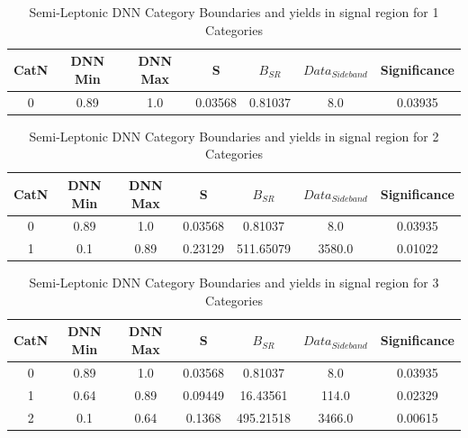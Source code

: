 \newpage 

\begin{table}[H]
  \begin{center}
    \begin{tabular}{c|c|c|c|c|c|c}
    CatN & DNN Min & DNN Max & S & $B_{SR}$ & $Data_{Sideband}$ & Significance\\ \hline
    0 & 0.89 & 1.0 & 0.03568 & 0.81037 & 8.0 & 0.03935 \\ 
    \end{tabular}
  \end{center}
\caption{
    Semi-Leptonic DNN Category Boundaries and yields in signal region for 1 Categories
}
\label{tab:SLcategories_1}
\end{table}
 
\begin{table}[H]
  \begin{center}
    \begin{tabular}{c|c|c|c|c|c|c}
    CatN & DNN Min & DNN Max & S & $B_{SR}$ & $Data_{Sideband}$ & Significance\\ \hline
    0 & 0.89 & 1.0 & 0.03568 & 0.81037 & 8.0 & 0.03935 \\ 
    1 & 0.1 & 0.89 & 0.23129 & 511.65079 & 3580.0 & 0.01022 \\ 
    \end{tabular}
  \end{center}
\caption{
    Semi-Leptonic DNN Category Boundaries and yields in signal region for 2 Categories
}
\label{tab:SLcategories_2}
\end{table}
 
\begin{table}[H]
  \begin{center}
    \begin{tabular}{c|c|c|c|c|c|c}
    CatN & DNN Min & DNN Max & S & $B_{SR}$ & $Data_{Sideband}$ & Significance\\ \hline
    0 & 0.89 & 1.0 & 0.03568 & 0.81037 & 8.0 & 0.03935 \\ 
    1 & 0.64 & 0.89 & 0.09449 & 16.43561 & 114.0 & 0.02329 \\ 
    2 & 0.1 & 0.64 & 0.1368 & 495.21518 & 3466.0 & 0.00615 \\ 
    \end{tabular}
  \end{center}
\caption{
    Semi-Leptonic DNN Category Boundaries and yields in signal region for 3 Categories
}
\label{tab:SLcategories_3}
\end{table}
 
